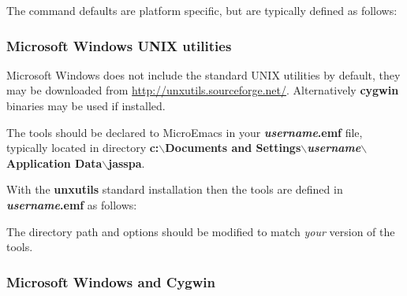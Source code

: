 \documentclass[11pt,a4paper,pdftex]{article}
\begin{document}
  The command defaults are platform specific, but are typically defined as
  follows:


\subsubsection{Microsoft Windows UNIX utilities}

  Microsoft Windows does not include the standard UNIX utilities by default,
  they may be downloaded from
  \href{http://unxutils.sourceforge.net/}{http://unxutils.sourceforge.net/}.
  Alternatively \textbf{cygwin} binaries may be used if installed.

  The tools should be declared to MicroEmacs in your
  \textbf{\textit{username}.emf} file, typically located in directory
  \textbf{c:$\backslash$Documents and
  Settings$\backslash$\textit{username}$\backslash$Application
  Data$\backslash$jasspa}.

  With the \textbf{unxutils} standard installation
  then the tools are defined in \textbf{\textit{username}.emf} as follows:


  The directory path and options should be modified to match \textit{your}
  version of the tools.

\subsubsection{Microsoft Windows and Cygwin}
\end{document}
